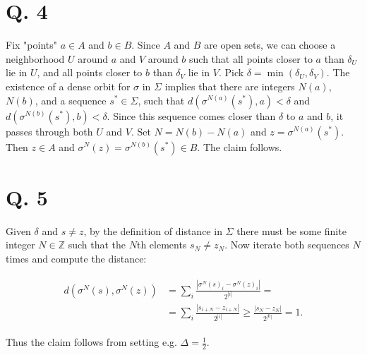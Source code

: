 \documentclass[12pt,A4]{article}
\begin{document}
\clearpage
\section*{Q. 4}
Fix "points" $a \in A$ and $b \in B$. Since $A$ and $B$ are open sets, we can choose a neighborhood $U$ around $a$ and $V$ around $b$ such that all points closer to $a$ than $\delta_U$ lie in $U$, and all points closer to $b$ than $\delta_V$ lie in $V$. Pick $\delta = \min(\delta_U, \delta_V)$. The existence of a dense orbit for $\sigma$ in $\Sigma$ implies that there are integers $N(a)$, $N(b)$, and a sequence $s^* \in \Sigma$, such that $d(\sigma^{N(a)}(s^*), a) < \delta$ and $d(\sigma^{N(b)}(s^*), b) < \delta$. Since this sequence comes closer than $\delta$ to $a$ and $b$, it passes through both $U$ and $V$. Set $N = N(b) - N(a)$ and $z = \sigma^{N(a)}(s^*)$. Then $z \in A$ and $\sigma^N(z) = \sigma^{N(b)}(s^*) \in B$. The claim follows.

\clearpage
\section*{Q. 5}

Given $\delta$ and $s \ne z$, by the definition of distance in $\Sigma$ there must be some finite integer $N \in \mathbb{Z}$ such that the $N$th elements $s_{N} \ne z_{N}$. Now iterate both sequences $N$ times and compute the distance: 

\begin{align}
\begin{aligned}
    d(\sigma^N(s), \sigma^N(z)) &= \sum_i \frac{|\sigma^N(s)_i - \sigma^N(z)_i|}{2^{|i|}} =\\&= \sum_i \frac{|s_{i+N} - z_{i+N}|}{2^{|i|}} \geq \frac{|s_{N} - z_{N}|}{2^{|0|}} = 1.
\end{aligned}
\end{align}

Thus the claim follows from setting e.g. $\Delta = \frac{1}{2}$.
\end{document}
